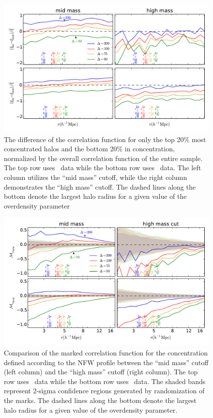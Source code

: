 \documentclass[usenatbib,usegraphicx,letterpaper]{mn2e}
\begin{document}
\begin{figure}
	\centering
	\includegraphics[width=.9\textwidth]{all_cfhilow_z00_hostsvhigh.pdf}
	\caption{The difference of the correlation function for only the top 20\% most concentrated halos and the bottom 20\% in concentration, normalized by the overall correlation function of the entire sample. The top row uses \simB \ data while the bottom row uses \simC \ data. The left column utilizes the ``mid mass'' cutoff, while the right column demonstrates the ``high mass'' cutoff. The dashed lines along the bottom denote the largest halo radius for a given value of the overdensity parameter}
	\label{fig:hvh_cfcompare}
\end{figure}

\begin{figure}
	\centering
	\includegraphics[width=.9\textwidth]{all_mcf_cnfw_z00_hostsvhigh.pdf}
	\caption{Comparison of the marked correlation function for the concentration defined according to the NFW profile between the ``mid mass'' cutoff (left column) and the ``high mass'' cutoff (right column). The top row uses \simB \ data while the bottom row uses \simC \ data. The shaded bands represent 2-sigma confidence regions generated by randomization of the marks. The dashed lines along the bottom denote the largest halo radius for a given value of the overdensity parameter.}
	\label{fig:hvh_mcf_cnfw}
\end{figure}
\end{document}
